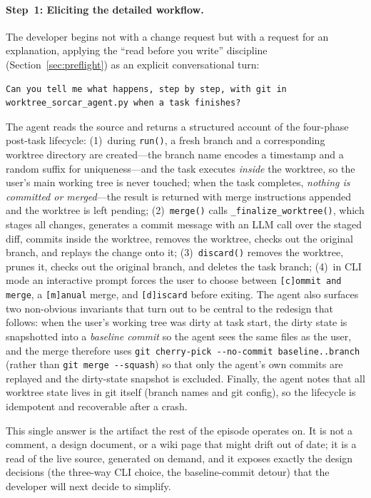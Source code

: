 \documentclass{article}
\begin{document}
\paragraph{Step~1: Eliciting the detailed workflow.}
The developer begins not with a change request but with a request for
an explanation, applying the ``read before you write'' discipline
(Section~\ref{sec:preflight}) as an explicit conversational turn:

\begin{lstlisting}[style=prompt]
Can you tell me what happens, step by step, with git in
worktree_sorcar_agent.py when a task finishes?
\end{lstlisting}

\noindent The agent reads the source and returns a structured account
of the four-phase post-task lifecycle:
(1)~during \texttt{run()}, a fresh branch and a corresponding worktree
directory are created---the branch name encodes a timestamp and a
random suffix for uniqueness---and the task executes \emph{inside} the
worktree, so the user's main working tree is never touched; when the
task completes, \emph{nothing is committed or merged}---the result is
returned with merge instructions appended and the worktree is left
pending;
(2)~\texttt{merge()} calls \texttt{\_finalize\_worktree()}, which stages
all changes, generates a commit message with an LLM call over the
staged diff, commits inside the worktree, removes the worktree, checks
out the original branch, and replays the change onto it;
(3)~\texttt{discard()} removes the worktree, prunes it, checks out the
original branch, and deletes the task branch;
(4)~in CLI mode an interactive prompt forces the user to choose between
\texttt{[c]ommit and merge}, a \texttt{[m]anual} merge, and
\texttt{[d]iscard} before exiting.
The agent also surfaces two non-obvious invariants that turn out to be
central to the redesign that follows: when the user's working tree was
dirty at task start, the dirty state is snapshotted into a
\emph{baseline commit} so the agent sees the same files as the user,
and the merge therefore uses
\texttt{git cherry-pick -{}-no-commit baseline..branch} (rather than
\texttt{git merge -{}-squash}) so that only the agent's own commits are
replayed and the dirty-state snapshot is excluded.
Finally, the agent notes that all worktree state lives in git itself
(branch names and git config), so the lifecycle is idempotent and
recoverable after a crash.

This single answer is the artifact the rest of the episode operates on.
It is not a comment, a design document, or a wiki page that might drift
out of date; it is a read of the live source, generated on demand, and
it exposes exactly the design decisions (the three-way CLI choice, the
baseline-commit detour) that the developer will next decide to
simplify.
\end{document}
